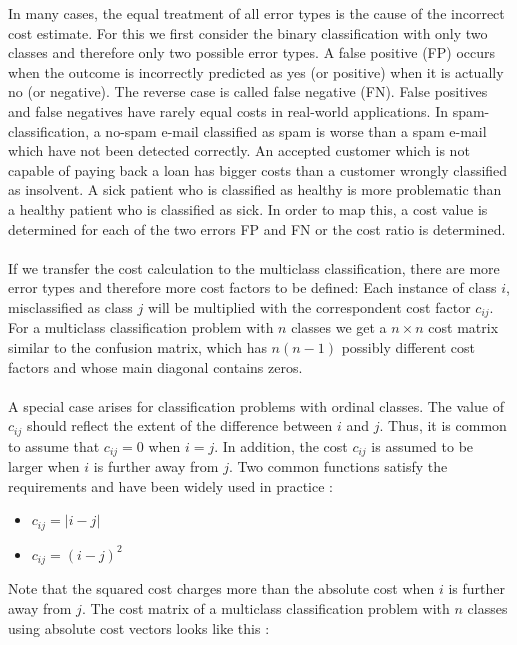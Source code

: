 \documentclass[article,type=msc,colorback,accentcolor=tud7b]{tudthesis}
\begin{document}
    In many cases, the equal treatment of all error types is the cause of the incorrect cost estimate. For this we first consider the binary classification with only two classes and therefore only two possible error types. A false positive (FP) occurs when the outcome is incorrectly predicted as yes (or positive) when it is actually no (or negative). The reverse case is called false negative (FN). False positives and false negatives have rarely equal costs in real-world applications. In spam-classification, a no-spam e-mail classified as spam is worse than a spam e-mail which have not been detected correctly. An accepted customer which is not capable of paying back a loan has bigger costs than a customer wrongly classified as insolvent. A sick patient who is classified as healthy is more problematic than a healthy patient who is classified as sick. In order to map this, a cost value is determined for each of the two errors FP and FN or the cost ratio is determined. \\\\
    If we transfer the cost calculation to the multiclass classification, there are more error types and therefore more cost factors to be defined: Each instance of class $i$, misclassified as class $j$ will be multiplied with the correspondent cost factor $c_{ij}$. For a multiclass classification problem with $n$ classes we get a $n\times n$ cost matrix similar to the confusion matrix, which has $n(n-1)$ possibly different cost factors and whose main diagonal contains zeros. \\\\
    A special case arises for classification problems with ordinal classes. The value of $c_{ij}$ should reflect the extent of the difference between $i$ and $j$. Thus, it is common to assume that $c_{ij}=0$ when $i=j$. In addition, the cost $c_{ij}$ is assumed to be larger when $i$ is further away from $j$. Two common functions satisfy the requirements and have been widely used in practice \autocite[Section~3.1]{Ruan2014}:
    \begin{itemize}
      \item {} $c_{ij}=\left|i-j\right|$
      \item {} $c_{ij}=\left(i-j\right)^{2}$
    \end{itemize}
    Note that the squared cost charges more than the absolute cost when $i$ is further away from $j$. The cost matrix of a multiclass classification problem with $n$ classes using absolute cost vectors looks like this \autocite[Section~3]{Kotsiantis2004}:
\end{document}
